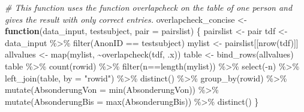 \documentclass[
]{article}
\newenvironment{Shaded}{\begin{snugshade}}{\end{snugshade}}
\newcommand{\AttributeTok}[1]{\textcolor[rgb]{0.77,0.63,0.00}{#1}}
\newcommand{\CommentTok}[1]{\textcolor[rgb]{0.56,0.35,0.01}{\textit{#1}}}
\newcommand{\ControlFlowTok}[1]{\textcolor[rgb]{0.13,0.29,0.53}{\textbf{#1}}}
\newcommand{\FunctionTok}[1]{\textcolor[rgb]{0.00,0.00,0.00}{#1}}
\newcommand{\NormalTok}[1]{#1}
\newcommand{\OtherTok}[1]{\textcolor[rgb]{0.56,0.35,0.01}{#1}}
\newcommand{\SpecialCharTok}[1]{\textcolor[rgb]{0.00,0.00,0.00}{#1}}
\newcommand{\StringTok}[1]{\textcolor[rgb]{0.31,0.60,0.02}{#1}}
\begin{document}
\begin{Shaded}
\begin{Highlighting}[]
\CommentTok{\# This function uses the function overlapcheck on the table of one person and gives the result with only correct entries. }
\NormalTok{overlapcheck\_concise }\OtherTok{\textless{}{-}} \ControlFlowTok{function}\NormalTok{(data\_input, testsubject, }\AttributeTok{pair =}\NormalTok{ pairslist) \{}
\NormalTok{  pairslist }\OtherTok{\textless{}{-}}\NormalTok{ pair}
\NormalTok{  tdf }\OtherTok{\textless{}{-}}\NormalTok{ data\_input }\SpecialCharTok{\%\textgreater{}\%} \FunctionTok{filter}\NormalTok{(AnonID }\SpecialCharTok{==}\NormalTok{ testsubject) }
\NormalTok{  mylist }\OtherTok{\textless{}{-}}\NormalTok{ pairslist[[}\FunctionTok{nrow}\NormalTok{(tdf)]]}
\NormalTok{  allvalues }\OtherTok{\textless{}{-}} \FunctionTok{map}\NormalTok{(mylist, }\SpecialCharTok{\textasciitilde{}}\FunctionTok{overlapcheck}\NormalTok{(tdf, .x))}
\NormalTok{  table }\OtherTok{\textless{}{-}} \FunctionTok{bind\_rows}\NormalTok{(allvalues) }
\NormalTok{  table }\SpecialCharTok{\%\textgreater{}\%} 
    \FunctionTok{count}\NormalTok{(rowid) }\SpecialCharTok{\%\textgreater{}\%} 
    \FunctionTok{filter}\NormalTok{(n}\SpecialCharTok{==}\FunctionTok{length}\NormalTok{(mylist)) }\SpecialCharTok{\%\textgreater{}\%} 
    \FunctionTok{select}\NormalTok{(}\SpecialCharTok{{-}}\NormalTok{n) }\SpecialCharTok{\%\textgreater{}\%}  
    \FunctionTok{left\_join}\NormalTok{(table, }\AttributeTok{by =} \StringTok{"rowid"}\NormalTok{) }\SpecialCharTok{\%\textgreater{}\%} 
    \FunctionTok{distinct}\NormalTok{() }\SpecialCharTok{\%\textgreater{}\%} 
    \FunctionTok{group\_by}\NormalTok{(rowid) }\SpecialCharTok{\%\textgreater{}\%} 
    \FunctionTok{mutate}\NormalTok{(}\AttributeTok{AbsonderungVon =} \FunctionTok{min}\NormalTok{(AbsonderungVon)) }\SpecialCharTok{\%\textgreater{}\%} 
    \FunctionTok{mutate}\NormalTok{(}\AttributeTok{AbsonderungBis =} \FunctionTok{max}\NormalTok{(AbsonderungBis)) }\SpecialCharTok{\%\textgreater{}\%} 
    \FunctionTok{distinct}\NormalTok{()}
\NormalTok{\}}



\end{Highlighting}
\end{Shaded}
\end{document}
